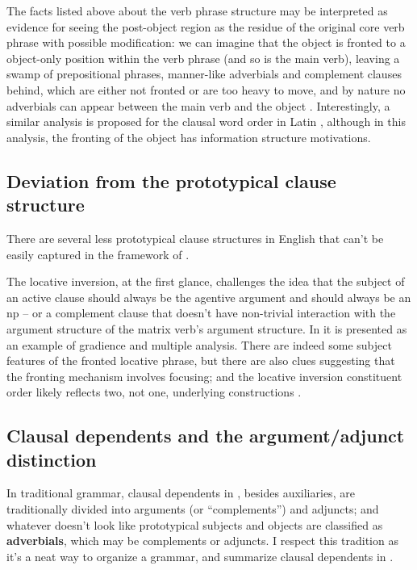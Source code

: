 \documentclass[UTF8, a4paper, oneside, scheme=plain, 12pt]{ctexbook}
\newcommand*{\citepage}[1]{p.~{#1}}
\newcommand*{\citepages}[1]{pp.~{#1}}
\newcommand*{\concept}[1]{\textbf{#1}}
\begin{document}
The facts listed above about the verb phrase structure  
may be interpreted as evidence for seeing the post-object region 
as the residue of the original core verb phrase with possible modification: 
we can imagine that the object is fronted to a object-only position within the verb phrase 
(and so is the main verb), 
leaving a swamp of prepositional phrases, manner-like adverbials and complement clauses behind, 
which are either not fronted or are too heavy to move,
and by nature no adverbials can appear between the main verb and the object
\citep[\citepages{26-28}]{koizumi1995phrase}.
Interestingly, a similar analysis is proposed for the clausal word order in Latin 
\citep[\citepage{88}]{devine2006latin}, 
although in this analysis, the fronting of the object has information structure motivations.

\subsection{Deviation from the prototypical clause structure}

There are several less prototypical clause structures in English 
that can't be easily captured in the framework of .

The locative inversion, at the first glance, 
challenges the idea that the subject of an active clause should always be the agentive argument
and should always be an \acs{np} 
-- or a complement clause that doesn't have non-trivial interaction 
with the argument structure of the matrix verb's argument structure.
In \citet[\citepage{60}]{quirk1985} it is presented as an example of gradience and multiple analysis.
There are indeed some subject features of the fronted locative phrase, 
but there are also clues suggesting that the fronting mechanism involves focusing; 
and the locative inversion constituent order likely reflects 
two, not one, underlying constructions \citep{diercks2017}.

\subsection{Clausal dependents and the argument/adjunct distinction}

In traditional grammar,
clausal dependents in ,
besides auxiliaries, are traditionally divided into arguments (or ``complements'') and adjuncts; 
and whatever doesn't look like prototypical subjects and objects 
are classified as \concept{adverbials}, 
which may be complements or adjuncts.
I respect this tradition as it's a neat way to organize a grammar, 
and summarize clausal dependents in .
\end{document}
